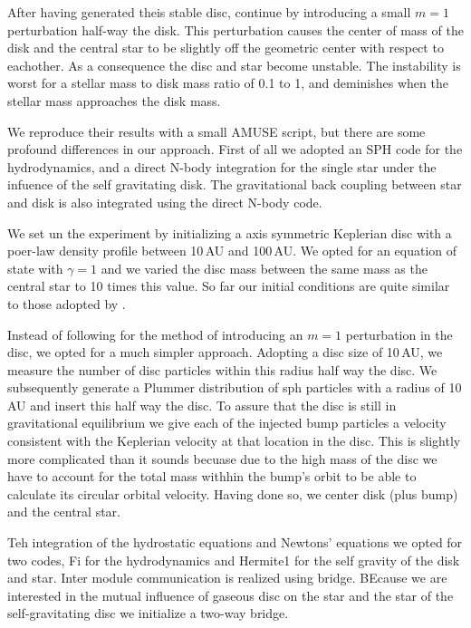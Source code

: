 After having generated theis stable disc, \cite{1992A&A...260..161H}
continue by introducing a small $m=1$ perturbation half-way the disk.
This perturbation causes the center of mass of the disk and the
central star to be slightly off the geometric center with respect to
eachother. As a consequence the disc and star become unstable.  The
instability is worst for a stellar mass to disk mass ratio of 0.1 to
1, and deminishes when the stellar mass approaches the disk mass.

We reproduce their results with a small AMUSE script, but there are
some profound differences in our approach. First of all we adopted an
SPH code for the hydrodynamics, and a direct N-body integration for
the single star under the infuence of the self gravitating disk.  The
gravitational back coupling between star and disk is also integrated
using the direct N-body code.

We set un the experiment by initializing a axis symmetric Keplerian
disc with a poer-law density profile between 10\,AU and 100\,AU.  We
opted for an equation of state with $\gamma=1$ and we varied the disc
mass between the same mass as the central star to 10 times this value.
So far our initial conditions are quite similar to those adopted by
\cite{1992A&A...260..161H}.

Instead of following \cite{1992A&A...260..161H} for the method of
introducing an $m=1$ perturbation in the disc, we opted for a much
simpler approach. Adopting a disc size of 10\,AU, we measure the
number of disc particles within this radius half way the disc. We
subsequently generate a Plummer distribution of sph particles with a
radius of 10\,AU and insert this half way the disc. To assure that the
disc is still in gravitational equilibrium we give each of the
injected bump particles a velocity consistent with the Keplerian
velocity at that location in the disc. This is slightly more
complicated than it sounds becuase due to the high mass of the disc we
have to account for the total mass withhin the bump's orbit to be able
to calculate its circular orbital velocity. Having done so, we center
disk (plus bump) and the central star.

Teh integration of the hydrostatic equations and Newtons' equations we
opted for two codes, Fi for the hydrodynamics and Hermite1 for the
self gravity of the disk and star. Inter module communication is
realized using bridge. BEcause we are interested in the mutual
influence of gaseous disc on the star and the star of the
self-gravitating disc we initialize a two-way bridge.

